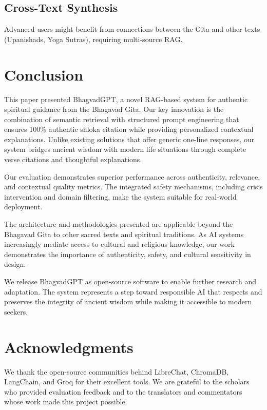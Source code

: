 \documentclass[conference]{IEEEtran}
\begin{document}
\subsection{Cross-Text Synthesis}
Advanced users might benefit from connections between the Gita and other texts (Upanishads, Yoga Sutras), requiring multi-source RAG.

\section{Conclusion}

This paper presented BhagvadGPT, a novel RAG-based system for authentic spiritual guidance from the Bhagavad Gita. Our key innovation is the combination of semantic retrieval with structured prompt engineering that ensures 100\% authentic shloka citation while providing personalized contextual explanations. Unlike existing solutions that offer generic one-line responses, our system bridges ancient wisdom with modern life situations through complete verse citations and thoughtful explanations.

Our evaluation demonstrates superior performance across authenticity, relevance, and contextual quality metrics. The integrated safety mechanisms, including crisis intervention and domain filtering, make the system suitable for real-world deployment.

The architecture and methodologies presented are applicable beyond the Bhagavad Gita to other sacred texts and spiritual traditions. As AI systems increasingly mediate access to cultural and religious knowledge, our work demonstrates the importance of authenticity, safety, and cultural sensitivity in design.

We release BhagvadGPT as open-source software to enable further research and adaptation. The system represents a step toward responsible AI that respects and preserves the integrity of ancient wisdom while making it accessible to modern seekers.

\section*{Acknowledgments}

We thank the open-source communities behind LibreChat, ChromaDB, LangChain, and Groq for their excellent tools. We are grateful to the scholars who provided evaluation feedback and to the translators and commentators whose work made this project possible.
\end{document}
